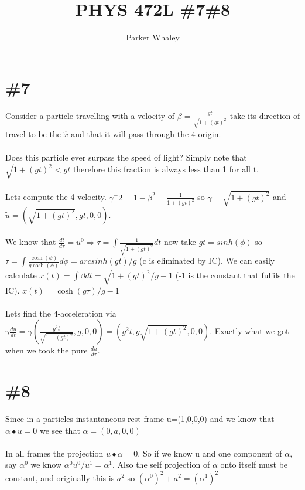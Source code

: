 \documentclass[11pt,a4paper]{article}
\author{Parker Whaley}
\title{PHYS 472L \#7\#8}
\begin{document}
\maketitle

\section{\#7}
Consider a particle travelling with a velocity of $\beta=\frac{gt}{\sqrt{1+(gt)^2}}$ take its direction of travel to be the $\hat{x}$ and that it will pass through the 4-origin.\\\\

Does this particle ever surpass the speed of light?  Simply note that $\sqrt{1+(gt)^2}<gt$ therefore this fraction is always less than 1 for all t.\\\\

Lets compute the 4-velocity. $\gamma^-2=1-\beta^2=\frac{1}{1+(gt)^2}$ so $\gamma=\sqrt{1+(gt)^2}$ and $\tilde{u}=(\sqrt{1+(gt)^2},gt,0,0)$.\\\\

We know that $\frac{dt}{d\tau}=u^0\Rightarrow \tau=\int\frac{1}{\sqrt{1+(gt)^2}}dt$ now take $gt=sinh(\phi)$ so $\tau=\int \frac{\cosh(\phi)}{g\cosh(\phi)}d\phi=arcsinh(gt)/g$ (c is eliminated by IC).  We can easily calculate $x(t)=\int \beta dt=\sqrt{1+(gt)^2}/g-1$ (-1 is the constant that fulfils the IC).  $x(t)=\cosh(g\tau)/g-1$\\\\

Lets find the 4-acceleration via $\gamma\frac{du}{dt}=\gamma(\frac{g^2t}{\sqrt{1+(gt)^2}},g,0,0)=(g^2t,g\sqrt{1+(gt)^2},0,0)$.  Exactly what we got when we took the pure $\frac{du}{d\tau}$.\\

\section{\#8}
Since in a particles instantaneous rest frame u=(1,0,0,0) and we know that $\alpha\bullet u=0$ we see that $\alpha=(0,a,0,0)$\\\\

In all frames the projection $u\bullet\alpha=0$.  So if we know u and one component of $\alpha$, say $\alpha^0$ we know $\alpha^0u^0/u^1=\alpha^1$.  Also the self projection of $\alpha$ onto itself must be constant, and originally this is $a^2$ so $(\alpha^0)^2+a^2=(\alpha^1)^2$\\\\
\end{document}
